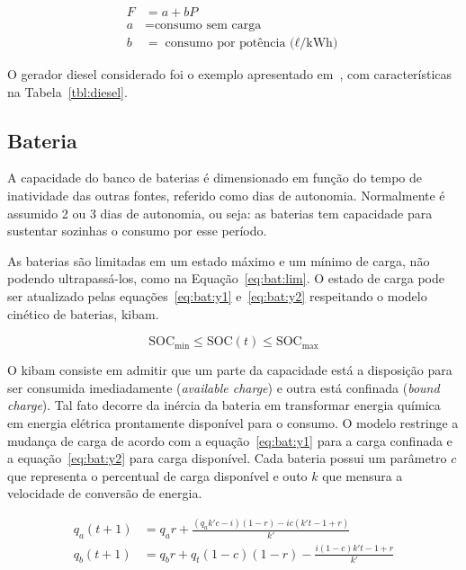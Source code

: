 \begin{align}
  \label{eq:diesel} F &= a + b P \\
  \nonumber a &= \text{consumo sem carga}\\
  \nonumber b &= \text{consumo por potência ($\ell$/kWh)}
\end{align}

O gerador diesel considerado foi o exemplo apresentado
em~\citeauthor{manwell2006hybrid2}, com características na
Tabela~\ref{tbl:diesel}.



\subsection{Bateria}

A capacidade do banco de baterias é dimensionado em função do tempo de
inatividade das outras fontes, referido como dias de autonomia.  Normalmente é
assumido 2 ou 3 dias de autonomia, ou seja: as baterias tem capacidade para
sustentar sozinhas o consumo por esse período.

As baterias são limitadas em um estado máximo e um mínimo de carga, não podendo
ultrapassá-los, como na Equação~\ref{eq:bat:lim}. O estado de carga pode ser
atualizado pelas equações~\ref{eq:bat:y1} e~\ref{eq:bat:y2} respeitando o modelo cinético de
baterias, \acrlong{kibam}.

\begin{equation}
  \label{eq:bat:lim}           \text{SOC}_{\text{min}} \leq \text{SOC}(t)   \leq \text{SOC}_{\text{max}}
\end{equation}

O \acrshort{kibam} consiste em admitir que um parte da capacidade está a
disposição para ser consumida imediadamente (\emph{available charge}) e outra
está confinada (\emph{bound charge}). Tal fato decorre da inércia da bateria em
transformar energia química em energia elétrica prontamente disponível para o
consumo.  O modelo restringe a mudança de carga de acordo com a
equação~\ref{eq:bat:y1} para a carga confinada e a equação~\ref{eq:bat:y2} para
carga disponível. Cada bateria possui um parâmetro $c$ que representa o
percentual de carga disponível e outo $k$ que mensura a velocidade de conversão
de energia.

\begin{align}
  \label{eq:bat:y1}    q_a(t+1) &= q_a r + \frac{(q_a k' c - i) (1 - r) - i c (k' t - 1 + r)}{k'} \\
  \label{eq:bat:y2}    q_b(t+1) &= q_b r + q_t (1 - c) (1 - r) - \frac{i (1 - c) k' t - 1 + r}{k'}
\end{align}


